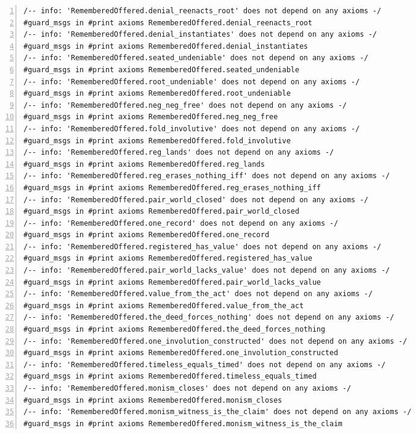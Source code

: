 \documentclass[10pt]{article}
\newcommand{\leansize}{\fontsize{5.5pt}{6.75pt}\selectfont}
\begin{document}
\begin{multicols}{2}
\begin{Verbatim}[numbers=left,firstnumber=1,numbersep=3pt,xleftmargin=2.6em,breaklines=true,breakanywhere=true,breakautoindent=false,breakindent=1.4em,breaksymbolleft={},breakanywheresymbolpre={},fontsize=\leansize]
/-- info: 'RememberedOffered.denial_reenacts_root' does not depend on any axioms -/
#guard_msgs in #print axioms RememberedOffered.denial_reenacts_root
/-- info: 'RememberedOffered.denial_instantiates' does not depend on any axioms -/
#guard_msgs in #print axioms RememberedOffered.denial_instantiates
/-- info: 'RememberedOffered.seated_undeniable' does not depend on any axioms -/
#guard_msgs in #print axioms RememberedOffered.seated_undeniable
/-- info: 'RememberedOffered.root_undeniable' does not depend on any axioms -/
#guard_msgs in #print axioms RememberedOffered.root_undeniable
/-- info: 'RememberedOffered.neg_neg_free' does not depend on any axioms -/
#guard_msgs in #print axioms RememberedOffered.neg_neg_free
/-- info: 'RememberedOffered.fold_involutive' does not depend on any axioms -/
#guard_msgs in #print axioms RememberedOffered.fold_involutive
/-- info: 'RememberedOffered.reg_lands' does not depend on any axioms -/
#guard_msgs in #print axioms RememberedOffered.reg_lands
/-- info: 'RememberedOffered.reg_erases_nothing_iff' does not depend on any axioms -/
#guard_msgs in #print axioms RememberedOffered.reg_erases_nothing_iff
/-- info: 'RememberedOffered.pair_world_closed' does not depend on any axioms -/
#guard_msgs in #print axioms RememberedOffered.pair_world_closed
/-- info: 'RememberedOffered.one_record' does not depend on any axioms -/
#guard_msgs in #print axioms RememberedOffered.one_record
/-- info: 'RememberedOffered.registered_has_value' does not depend on any axioms -/
#guard_msgs in #print axioms RememberedOffered.registered_has_value
/-- info: 'RememberedOffered.pair_world_lacks_value' does not depend on any axioms -/
#guard_msgs in #print axioms RememberedOffered.pair_world_lacks_value
/-- info: 'RememberedOffered.value_from_the_act' does not depend on any axioms -/
#guard_msgs in #print axioms RememberedOffered.value_from_the_act
/-- info: 'RememberedOffered.the_deed_forces_nothing' does not depend on any axioms -/
#guard_msgs in #print axioms RememberedOffered.the_deed_forces_nothing
/-- info: 'RememberedOffered.one_involution_constructed' does not depend on any axioms -/
#guard_msgs in #print axioms RememberedOffered.one_involution_constructed
/-- info: 'RememberedOffered.timeless_equals_timed' does not depend on any axioms -/
#guard_msgs in #print axioms RememberedOffered.timeless_equals_timed
/-- info: 'RememberedOffered.monism_closes' does not depend on any axioms -/
#guard_msgs in #print axioms RememberedOffered.monism_closes
/-- info: 'RememberedOffered.monism_witness_is_the_claim' does not depend on any axioms -/
#guard_msgs in #print axioms RememberedOffered.monism_witness_is_the_claim

\end{Verbatim}
\end{multicols}
\end{document}
